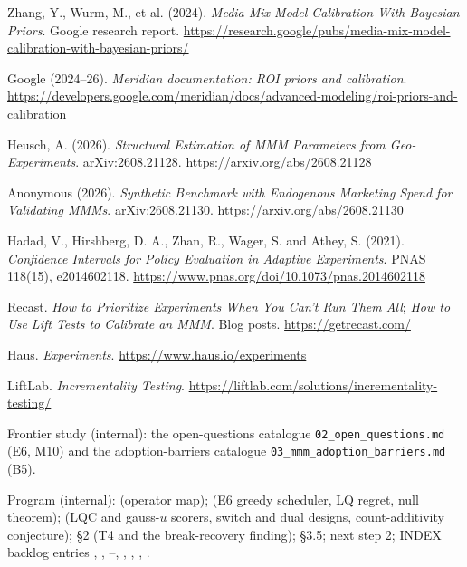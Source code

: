 \begin{enumerate}[label={[\arabic*]},leftmargin=2.5em]
\item Zhang, Y., Wurm, M., et al. (2024). \emph{Media Mix Model Calibration With Bayesian Priors}. Google research report. \url{https://research.google/pubs/media-mix-model-calibration-with-bayesian-priors/}
\item Google (2024--26). \emph{Meridian documentation: ROI priors and calibration}. \url{https://developers.google.com/meridian/docs/advanced-modeling/roi-priors-and-calibration}
\item Heusch, A. (2026). \emph{Structural Estimation of MMM Parameters from Geo-Experiments}. arXiv:2608.21128. \url{https://arxiv.org/abs/2608.21128}
\item Anonymous (2026). \emph{Synthetic Benchmark with Endogenous Marketing Spend for Validating MMMs}. arXiv:2608.21130. \url{https://arxiv.org/abs/2608.21130}
\item Hadad, V., Hirshberg, D. A., Zhan, R., Wager, S. and Athey, S. (2021). \emph{Confidence Intervals for Policy Evaluation in Adaptive Experiments}. PNAS 118(15), e2014602118. \url{https://www.pnas.org/doi/10.1073/pnas.2014602118}
\item Recast. \emph{How to Prioritize Experiments When You Can't Run Them All}; \emph{How to Use Lift Tests to Calibrate an MMM}. Blog posts. \url{https://getrecast.com/}
\item Haus. \emph{Experiments}. \url{https://www.haus.io/experiments}
\item LiftLab. \emph{Incrementality Testing}. \url{https://liftlab.com/solutions/incrementality-testing/}
\item Frontier study (internal): the open-questions catalogue \texttt{02\_open\_questions.md} (E6, M10) and the adoption-barriers catalogue \texttt{03\_mmm\_adoption\_barriers.md} (B5).
\item Program (internal):  (operator map);  (E6 greedy scheduler, LQ regret, null theorem);  (LQC and gauss-$u$ scorers, switch and dual designs, count-additivity conjecture);  \S2 (T4 and the break-recovery finding);  \S3.5;  next step 2; INDEX backlog entries , , --, , , , .
\end{enumerate}
\endgroup

